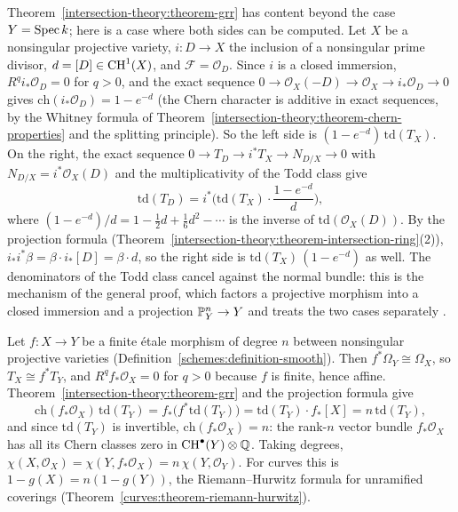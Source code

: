 \begin{example}\label{intersection-theory:example-grr-divisor}
Theorem~\ref{intersection-theory:theorem-grr} has content beyond the case $Y = \operatorname{Spec} k$; here is a case where both sides can be computed. Let $X$ be a nonsingular projective variety, $i \colon D \to X$ the inclusion of a
nonsingular prime divisor, $d = [D] \in \operatorname{CH}^1(X)$, and $\mathcal{F} = \mathcal{O}_D$. Since $i$ is a closed immersion, $R^qi_*\mathcal{O}_D = 0$ for $q > 0$, and the exact sequence
$0 \to \mathcal{O}_X(-D) \to \mathcal{O}_X \to i_*\mathcal{O}_D \to 0$ gives $\mathrm{ch}(i_*\mathcal{O}_D) = 1 - e^{-d}$ (the Chern character is additive in exact sequences, by the Whitney formula of
Theorem~\ref{intersection-theory:theorem-chern-properties} and the splitting principle). So the left side is $(1 - e^{-d})\,\mathrm{td}(T_X)$. On the right, the exact sequence $0 \to T_D \to i^*T_X \to N_{D/X} \to 0$ with
$N_{D/X} = i^*\mathcal{O}_X(D)$ and the multiplicativity of the Todd class give
\[
\mathrm{td}(T_D) = i^*\Big(\mathrm{td}(T_X)\cdot\frac{1 - e^{-d}}{d}\Big),
\]
where $(1 - e^{-d})/d = 1 - \frac12d + \frac16d^2 - \cdots$ is the inverse of $\mathrm{td}(\mathcal{O}_X(D))$. By the projection formula (Theorem~\ref{intersection-theory:theorem-intersection-ring}(2)), $i_*i^*\beta = \beta \cdot i_*[D] = \beta \cdot d$,
so the right side is $\mathrm{td}(T_X)\,(1 - e^{-d})$ as well. The denominators of the Todd class cancel against the normal bundle: this is the mechanism of the general proof, which factors a projective morphism into a
closed immersion and a projection $\mathbb{P}^n_Y \to Y$ and treats the two cases separately \cite[Chapter 15]{fulton-intersection}.
\end{example}

\begin{example}\label{intersection-theory:example-grr-etale}
Let $f \colon X \to Y$ be a finite \'etale morphism of degree $n$ between nonsingular projective varieties (Definition~\ref{schemes:definition-smooth}). Then $f^*\Omega_Y \cong \Omega_X$, so $T_X \cong f^*T_Y$, and
$R^qf_*\mathcal{O}_X = 0$ for $q > 0$ because $f$ is finite, hence affine. Theorem~\ref{intersection-theory:theorem-grr} and the projection formula give
\[
\mathrm{ch}(f_*\mathcal{O}_X)\,\mathrm{td}(T_Y) = f_*\big(f^*\mathrm{td}(T_Y)\big) = \mathrm{td}(T_Y)\cdot f_*[X] = n\,\mathrm{td}(T_Y),
\]
and since $\mathrm{td}(T_Y)$ is invertible, $\mathrm{ch}(f_*\mathcal{O}_X) = n$: the rank-$n$ vector bundle $f_*\mathcal{O}_X$ has all its Chern classes zero in $\operatorname{CH}^\bullet(Y) \otimes \mathbb{Q}$. Taking degrees,
$\chi(X, \mathcal{O}_X) = \chi(Y, f_*\mathcal{O}_X) = n\,\chi(Y, \mathcal{O}_Y)$. For curves this is $1 - g(X) = n(1 - g(Y))$, the Riemann--Hurwitz formula for unramified coverings
(Theorem~\ref{curves:theorem-riemann-hurwitz}).
\end{example}

